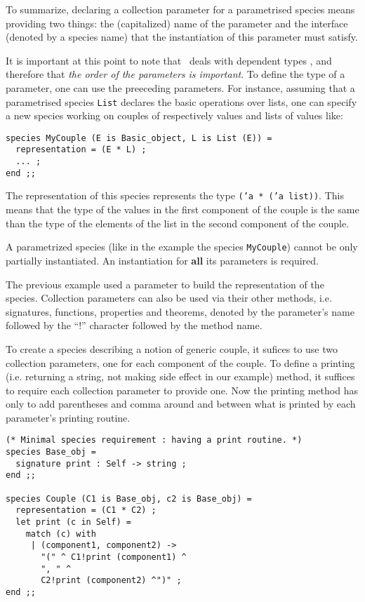 To summarize, declaring a collection parameter for a parametrised
species means providing two things: the (capitalized) name of the parameter and the
interface (denoted by a species name) that the instantiation of this
parameter must satisfy.



\smallskip It is important at this point to note that \focal\ deals with
dependent types , and therefore that {\em
  the order of the parameters is important}. To define the type of a
parameter, one can use the preeceding parameters. For instance, 
assuming that a parametrised species {\tt List} 
declares the basic operations over lists, one can specify a new
species working on couples of respectively values and lists of values
like: {\scriptsize
\begin{lstlisting}
species MyCouple (E is Basic_object, L is List (E)) =
  representation = (E * L) ;
  ... ;
end ;;
\end{lstlisting}
}

The representation of this species  represents the type
{\tt ('a * ('a list))}. This means that the type of the values in the
first component of the couple is the same than the type of the
elements of the list in the second component of the couple.


A parametrized species (like in
the example  the species {\tt MyCouple}) cannot be only partially
instantiated.  An
instantiation for {\bf all} its parameters is required. 


\medskip
\label{method-qualification}
The previous example  used
a parameter to build the representation of the species. 
Collection parameters can also be used via their other methods,
i.e. signatures, functions, properties and theorems, denoted by the
parameter's name followed by  the ``!''
character followed by the method name. 

To create a species describing a notion of generic couple, it sufices
to use two collection parameters, one for each component of the
couple. To define a printing (i.e. returning a string, not making side
effect in our example) method, it suffices to require each collection
parameter to provide one. Now the printing method has only to
add parentheses and comma around and between what is printed by each
parameter's printing routine.  
{\scriptsize
\begin{lstlisting}
(* Minimal species requirement : having a print routine. *)
species Base_obj =
  signature print : Self -> string ;
end ;;

species Couple (C1 is Base_obj, c2 is Base_obj) =
  representation = (C1 * C2) ;
  let print (c in Self) =
    match (c) with
     | (component1, component2) ->
       "(" ^ C1!print (component1) ^
       ", " ^
       C2!print (component2) ^")" ;
end ;;
\end{lstlisting}
}

